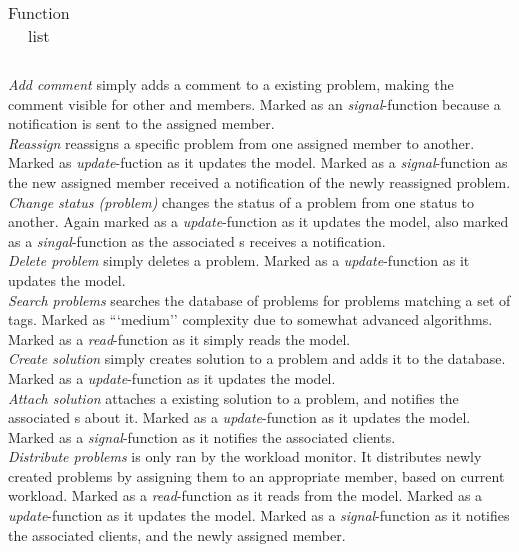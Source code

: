 \begin{table}[h]
\begin{center}
\begin{tabular}{|c|c|c|}
\end{tabular}
\end{center}
\caption{Function list}
\label{tab:functionlist}
\end{table}

\emph{Add comment} simply adds a comment to a existing problem, making the comment visible for other \client and \astaff[] members. Marked as an \textit{signal}-function because a notification is sent to the assigned \astaff[] member.  \\
\emph{Reassign} reassigns a specific problem from one assigned \astaff[] member to another. Marked as \textit{update}-fuction as it updates the model. Marked as a \textit{signal}-function as the new assigned \astaff[] member received a notification of the newly reassigned problem. \\
\emph{Change status (problem)} changes the status of a problem from one status to another. Again marked as a \textit{update}-function as it updates the model, also marked as a \textit{singal}-function as the associated \client s receives a notification. \\
\emph{Delete problem} simply deletes a problem. Marked as a \textit{update}-function as it updates the model. \\
\emph{Search problems} searches the database of problems for problems matching a set of tags. Marked as ```medium'' complexity due to somewhat advanced algorithms. Marked as a \textit{read}-function as it simply reads the model.\\
\emph{Create solution} simply creates solution to a problem and adds it to the database. Marked as a \textit{update}-function as it updates the model. \\
\emph{Attach solution} attaches a existing solution to a problem, and notifies the associated \client s about it. Marked as a \textit{update}-function as it updates the model. Marked as a \textit{signal}-function as it notifies the associated clients. \\
\emph{Distribute problems} is only ran by the workload monitor. It distributes newly created problems by assigning them to an appropriate \astaff[] member, based on current workload. %
 Marked as a \textit{read}-function as it reads from the model. Marked as a \textit{update}-function as it updates the model. Marked as a \textit{signal}-function as it notifies the associated clients, and the newly assigned \astaff[] member. \\
